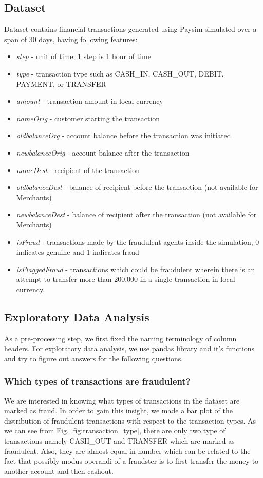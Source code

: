 \documentclass[letterpaper, 12 pt, conference]{ieeeconf}  %
\begin{document}
\subsection{Dataset} \label{subsec:dataset}
Dataset contains financial transactions generated using Paysim simulated over a span of 30 days, having following features:
\begin{itemize}
    \item \textit{step} - unit of time; 1 step is 1 hour of time
    \item \textit{type} - transaction type such as CASH\_IN, CASH\_OUT, DEBIT, PAYMENT, or TRANSFER
    \item \textit{amount} - transaction amount in local currency
    \item \textit{nameOrig} - customer starting the transaction
    \item \textit{oldbalanceOrg} - account balance before the transaction was initiated
    \item \textit{newbalanceOrig} - account balance after the transaction 
    \item \textit{nameDest} - recipient of the transaction
    \item \textit{oldbalanceDest} - balance of recipient before the transaction (not available for Merchants)
    \item \textit{newbalanceDest} - balance of recipient after the transaction (not available for Merchants)
    \item \textit{isFraud} - transactions made by the fraudulent agents inside the simulation, 0 indicates genuine and 1 indicates fraud
    \item \textit{isFlaggedFraud} - transactions which could be fraudulent wherein there is an attempt to transfer more than 200,000 in a single transaction in local currency.
\end{itemize}

\subsection{Exploratory Data Analysis}\label{subsec:exploration}
As a pre-processing step, we first fixed the naming terminology of column headers. For exploratory data analysis, we use pandas library and it's functions and try to figure out answers for the following questions.

\subsubsection{Which types of transactions are fraudulent?}
We are interested in knowing what types of transactions in the dataset are marked as fraud. In order to gain this insight, we made a bar plot of the distribution of fraudulent transactions with respect to the transaction types. As we can see from Fig. \ref{fig:transaction_type}, there are only two type of transactions namely CASH\_OUT and TRANSFER which are marked as fraudulent. Also, they are almost equal in number which can be related to the fact that possibly modus operandi of a fraudster is to first transfer the money to another account and then cashout.
\end{document}
